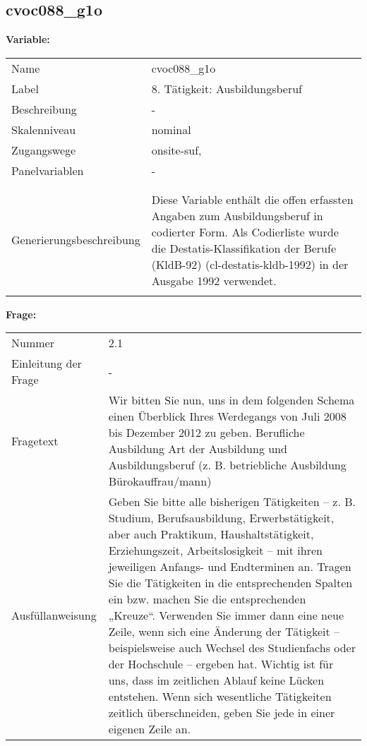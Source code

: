 	
	
	\subsection{cvoc088\_g1o}
	\label{subSection:cvoc088_g1o}

	\noindent\textbf{Variable:}\\
		\begin{tabular}{lL{11.3cm}}
			\label{tableVariable:cvoc088_g1o}
			Name & cvoc088\_g1o \\
			Label & 8. Tätigkeit: Ausbildungsberuf \\
			Beschreibung & - \\
			Skalenniveau & nominal \\
			Zugangswege &
				onsite-suf,
 \\
			Panelvariablen & -
			 \\
			 \\
 \\
					Generierungsbeschreibung & Diese Variable enthält die offen erfassten Angaben zum Ausbildungsberuf in codierter Form. Als Codierliste wurde die Destatis-Klassifikation der Berufe (KldB-92) (cl-destatis-kldb-1992) in der Ausgabe 1992 verwendet. 
				 \\	
			 \\
		\end{tabular}

		\vspace*{1 cm}
		\noindent\textbf{Frage:}\\
		\begin{tabular}{lL{11.3cm}}
			\label{tableQuestion:cvoc088_g1o}
			Nummer & 2.1 \\
			Einleitung der Frage & - \\
			Fragetext & Wir bitten Sie nun, uns in dem folgenden Schema einen Überblick Ihres Werdegangs von Juli 2008 bis Dezember 2012 zu geben.
Berufliche Ausbildung
Art der Ausbildung und Ausbildungsberuf
(z. B. betriebliche Ausbildung Bürokauffrau/mann) \\
			Ausfüllanweisung & Geben Sie bitte alle bisherigen Tätigkeiten – z. B. Studium, Berufsausbildung, Erwerbstätigkeit, aber auch Praktikum, Haushaltstätigkeit,
Erziehungszeit, Arbeitslosigkeit – mit ihren jeweiligen Anfangs- und Endterminen an. Tragen Sie die Tätigkeiten in die entsprechenden Spalten ein bzw. machen Sie die entsprechenden „Kreuze“. Verwenden Sie immer dann eine neue Zeile, wenn sich eine Änderung der Tätigkeit – beispielsweise auch Wechsel des Studienfachs oder der Hochschule – ergeben hat. Wichtig ist für uns, dass im zeitlichen Ablauf keine Lücken entstehen. Wenn sich wesentliche Tätigkeiten zeitlich überschneiden, geben Sie jede in einer eigenen Zeile an. \\
		\end{tabular}





